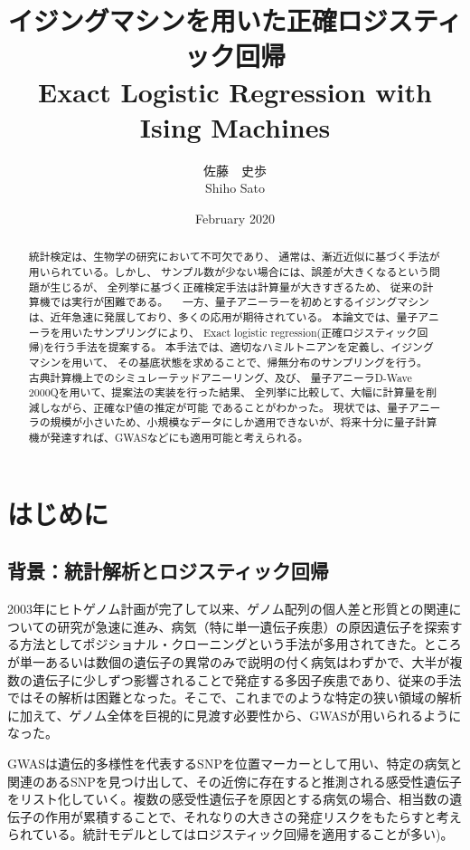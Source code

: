 \documentclass[12pt, dvipdfmx]{jmaster}
\title{イジングマシンを用いた正確ロジスティック回帰\\
Exact Logistic Regression with Ising Machines}
\author{佐藤　史歩\\ Shiho Sato}
\date{February 2020}
\theoremstyle{definition}
\begin{document}
\maketitle

\begin{abstract}
  統計検定は、生物学の研究において不可欠であり、
  通常は、漸近近似に基づく手法が用いられている。しかし、
  サンプル数が少ない場合には、誤差が大きくなるという問題が生じるが、
  全列挙に基づく正確検定手法は計算量が大きすぎるため、
  従来の計算機では実行が困難である。
  　一方、量子アニーラーを初めとするイジングマシンは、近年急速に発展しており、多くの応用が期待されている。
  本論文では、量子アニーラを用いたサンプリングにより、
  Exact logistic regression(正確ロジスティック回帰)を行う手法を提案する。
  本手法では、適切なハミルトニアンを定義し、イジングマシンを用いて、
  その基底状態を求めることで、帰無分布のサンプリングを行う。
  古典計算機上でのシミュレーテッドアニーリング、及び、
  量子アニーラD-Wave 2000Qを用いて、提案法の実装を行った結果、
  全列挙に比較して、大幅に計算量を削減しながら、正確なP値の推定が可能
  であることがわかった。
  現状では、量子アニーラの規模が小さいため、小規模なデータにしか適用できないが、将来十分に量子計算機が発達すれば、GWASなどにも適用可能と考えられる。
\end{abstract}
\newpage
\tableofcontents
\newpage

\chapter{はじめに} 
\label{sec:intro}
\section{背景：統計解析とロジスティック回帰}
2003年にヒトゲノム計画が完了して以来、ゲノム配列の個人差と形質との関連についての研究が急速に進み、病気（特に単一遺伝子疾患）の原因遺伝子を探索する方法としてポジショナル・クローニングという手法が多用されてきた。ところが単一あるいは数個の遺伝子の異常のみで説明の付く病気はわずかで、大半が複数の遺伝子に少しずつ影響されることで発症する多因子疾患であり、従来の手法ではその解析は困難となった。そこで、これまでのような特定の狭い領域の解析に加えて、ゲノム全体を巨視的に見渡す必要性から、GWASが用いられるようになった。

GWASは遺伝的多様性を代表するSNPを位置マーカーとして用い、特定の病気と関連のあるSNPを見つけ出して、その近傍に存在すると推測される感受性遺伝子をリスト化していく。複数の感受性遺伝子を原因とする病気の場合、相当数の遺伝子の作用が累積することで、それなりの大きさの発症リスクをもたらすと考えられている。統計モデルとしてはロジスティック回帰を適用することが多い\cite{duverle2015privacy})。
\end{document}
